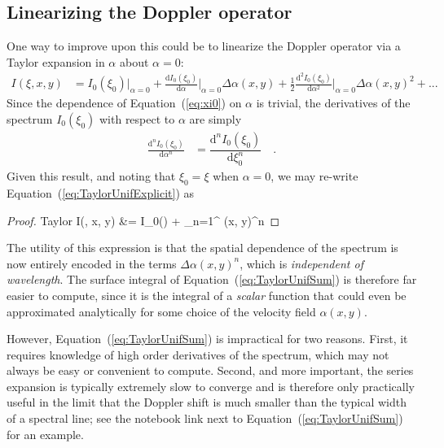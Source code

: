 \documentclass[modern]{aastex62}
\begin{document}
\subsection{Linearizing the Doppler operator}
\label{sec:taylor}
%
One way to improve upon this could be to linearize the Doppler operator via
a Taylor expansion in $\alpha$ about $\alpha=0$:
%
\begin{align}
    \label{eq:TaylorUnifExplicit}
    I(\xi, x, y) 
        &=
        I_0(\xi_0) \Bigg|_{\alpha=0}
        + 
        \frac{\mathrm{d}I_0(\xi_0)}{\mathrm{d}\alpha} \Bigg|_{\alpha=0} 
            \Delta\alpha(x, y)
        + 
        \frac{1}{2}\frac{\mathrm{d}^2I_0(\xi_0)}{\mathrm{d}\alpha^2} 
            \Bigg|_{\alpha=0} \Delta\alpha(x, y)^2
        +
        ... 
\end{align}
%
Since the dependence of Equation~(\ref{eq:xi0}) on $\alpha$ is trivial,
the derivatives of the spectrum $I_0(\xi_0)$ with respect to
$\alpha$ are simply
%
\begin{align}
    \frac{\mathrm{d}^nI_0(\xi_0)}{\mathrm{d}\alpha^n} &=
    \dfrac{\mathrm{d}^nI_0(\xi_0)}{\mathrm{d}\xi_0^n} \quad.
\end{align}
%
Given this result, and noting that $\xi_0 = \xi$ when $\alpha = 0$,
we may re-write Equation~(\ref{eq:TaylorUnifExplicit}) as
%
\begin{proof}{Taylor}
    \label{eq:TaylorUnifSum}
    I(\xi, x, y) 
        &=
        I_0(\xi)
        +
        \sum_{n=1}^\infty
            \Delta\alpha(x, y)^n
\end{proof}
%
The utility of this expression is that the spatial dependence of the spectrum
is now entirely encoded in the terms $\Delta\alpha(x, y)^n$, which is
\emph{independent of wavelength}. The surface integral of 
Equation~(\ref{eq:TaylorUnifSum}) is therefore far easier to compute, since
it is the integral of a \emph{scalar} function that could even be approximated
analytically for some choice of the velocity field $\alpha(x, y)$.

However, Equation~(\ref{eq:TaylorUnifSum}) is impractical for
two reasons. First, it requires knowledge of high order derivatives of the 
spectrum, which may not always be easy or convenient to compute. Second, and
more important, the series expansion is typically extremely slow to converge
and is therefore only practically useful in the limit that the Doppler shift
is much smaller than the typical width of a spectral line; see the notebook
link next to Equation~(\ref{eq:TaylorUnifSum}) for an example.
\end{document}

